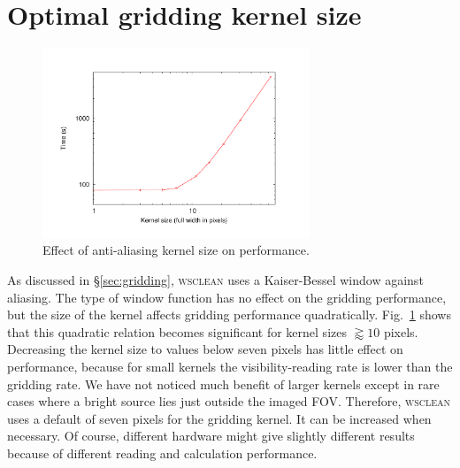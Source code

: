 \documentclass[useAMS,usenatbib]{mn2e}
\DeclareRobustCommand{\TUSSEN}[3]{#2}
\begin{document}
\section{Optimal gridding kernel size} \label{sec:gridding-appendix}
\begin{figure}
\begin{center}
\includegraphics[width=8cm]{img/benchmark-kernelsize/kernel}
\caption{Effect of anti-aliasing kernel size on performance.}
\label{fig:timing-kernelsize}
\end{center}
\end{figure}
As discussed in \S\ref{sec:gridding}, \textsc{wsclean} uses a Kaiser-Bessel window against aliasing. The type of window function has no effect on the gridding performance, but the size of the kernel affects gridding performance quadratically. Fig.~\ref{fig:timing-kernelsize} shows that this quadratic relation becomes significant for kernel sizes $\gtrapprox 10$ pixels. Decreasing the kernel size to values below seven pixels has little effect on performance, because for small kernels the visibility-reading rate is lower than the gridding rate. We have not noticed much benefit of larger kernels except in rare cases where a bright source lies just outside the imaged FOV. Therefore, \textsc{wsclean} uses a default of seven pixels for the gridding kernel. It can be increased when necessary. Of course, different hardware might give slightly different results because of different reading and calculation performance.

\DeclareRobustCommand{\TUSSEN}[3]{#3}




\label{lastpage}
\end{document}
